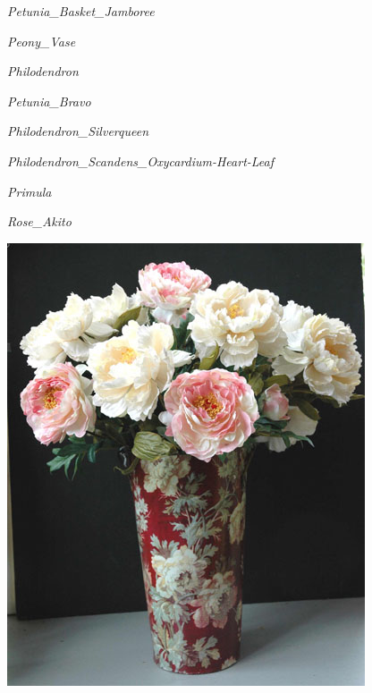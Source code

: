 \documentclass{article}
\begin{document}
\noindent   
\vfill
\centerline{{\Large\emph{Petunia_Basket_Jamboree}}}
\vfill
\newpage

\noindent   
\vfill
\centerline{{\Large\emph{Peony_Vase}}}
\vfill
\newpage

\noindent   
\vfill
\centerline{{\Large\emph{Philodendron}}}
\vfill
\newpage

\noindent   
\vfill
\centerline{{\Large\emph{Petunia_Bravo}}}
\vfill
\newpage

\noindent   
\vfill
\centerline{{\Large\emph{Philodendron_Silverqueen}}}
\vfill
\newpage

\noindent   
\vfill
\centerline{{\Large\emph{Philodendron_Scandens_Oxycardium-Heart-Leaf}}}
\vfill
\newpage

\noindent   
\vfill
\centerline{{\Large\emph{Primula}}}
\vfill
\newpage

\noindent   
\vfill
\centerline{{\Large\emph{Rose_Akito}}}
\vfill
\newpage

\begin{center}
\includegraphics[width=0.9\textheight, angle=90]{../Peony_Vase.jpg}
\end{center}
\newpage
\end{document}
